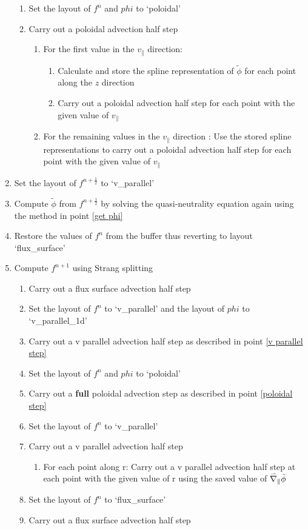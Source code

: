 \begin{enumerate}
\begin{enumerate}
  \item Set the layout of $f^n$ and $phi$ to `poloidal'
  \item Carry out a poloidal advection half step \label{poloidal step}
  \begin{enumerate}
   \item For the first value in the $v_\parallel$ direction:
   \begin{enumerate}
    \item Calculate and store the spline representation of $\tilde{\phi}$ for each point along the $z$ direction
    \item Carry out a poloidal advection half step for each point with the given value of $v_\parallel$
   \end{enumerate}
   \item For the remaining values in the $v_\parallel$ direction : Use the stored spline representations to carry out a poloidal advection half step for each point with the given value of $v_\parallel$
  \end{enumerate}
 \end{enumerate}
 \item Set the layout of $f^{n+\frac{1}{2}}$ to `v\_parallel'
 \item Compute $\tilde{\phi}$ from $f^{n+\frac{1}{2}}$ by solving the quasi-neutrality equation again using the method in point \ref{get phi}
 \item Restore the values of $f^{n}$ from the buffer thus reverting to layout `flux\_surface'
 \item Compute $f^{n+1}$ using Strang splitting
 \begin{enumerate}
  \item Carry out a flux surface advection half step
  \item Set the layout of $f^n$ to `v\_parallel' and the layout of $phi$ to `v\_parallel\_1d'
  \item Carry out a v parallel advection half step as described in point \ref{v parallel step}
  \item Set the layout of $f^n$ and $phi$ to `poloidal'
  \item Carry out a {\bf full} poloidal advection step as described in point \ref{poloidal step}
  \item Set the layout of $f^n$ to `v\_parallel'
  \item Carry out a v parallel advection half step
  \begin{enumerate}
    \item For each point along r:  Carry out a v parallel advection half step at each point with the given value of r using the saved value of $\accentset{\rightharpoonup}{\nabla}_\parallel \tilde{\phi}$
  \end{enumerate}
  \item Set the layout of $f^n$ to `flux\_surface'
  \item Carry out a flux surface advection half step
 \end{enumerate}
\end{enumerate}

